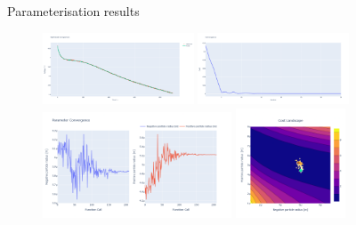 \documentclass[aspectratio=169]{beamer} %
\begin{document}
\begin{frame}{Parameterisation results}
    \vspace{-6mm}
    \begin{figure}
        \centering
        \includegraphics[width=0.4\textwidth, trim={0 0 0 0},clip]{Images/CMAES_quick_plot.png}
        \includegraphics[width=0.4\textwidth, trim={0 0 0 0},clip]{Images/CMAES_convergence.png} \\
        \includegraphics[width=0.5\textwidth, trim={0 0 0 0},clip]{Images/CMAES_parameters.png}
        \hspace{1cm}\includegraphics[width=0.29\textwidth, trim={0 0 0 0},clip]{Images/CMAES_cost_trace.png}
        \hspace{1cm}
        \label{fig:parameterisation}
    \end{figure}
\end{frame}
\end{document}
